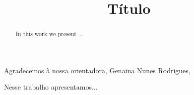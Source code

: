 \documentclass[mestrado]{unb-cic}
\title{Título}
\begin{document}
\maketitle

\pretextual
\begin{agradecimentos}
Agradecemos à nossa orientadora, \prof[a] \dr[a] Genaina Nunes Rodrigues, 
\end{agradecimentos}

\begin{resumo}
Nesse trabalho apresentamos...

\end{resumo}


\begin{abstract}\textbf{}

In this work we present ...

\end{abstract}

\tableofcontents
\listoffigures

\textual

%

\postextual
\anexos 




\end{document}
